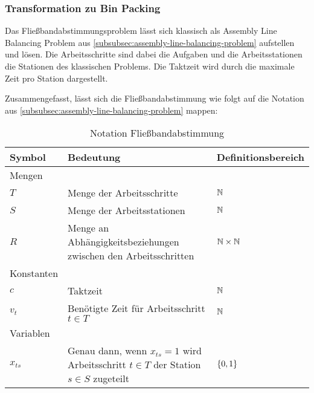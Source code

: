 \subsubsection*{Transformation zu Bin Packing}
Das Fließbandabstimmungsproblem lässt sich klassisch als Assembly Line Balancing Problem aus
\cref{subsubsec:assembly-line-balancing-problem} aufstellen und lösen.
Die Arbeitsschritte sind dabei die Aufgaben und die Arbeitsstationen die Stationen des klassischen Problems.
Die Taktzeit wird durch die maximale Zeit pro Station dargestellt.

Zusammengefasst, lässt sich die Fließbandabstimmung wie folgt auf die Notation aus
\cref{subsubsec:assembly-line-balancing-problem} mappen:
\begin{table}[H]
    \begin{tabularx}{\textwidth}{  l | X | l }
    Symbol & Bedeutung & Definitionsbereich \\\hline\hline
    Mengen & & \\\hline\hline
    $T$ & Menge der Arbeitsschritte & $\mathbb{N}$\\\hline
    $S$ & Menge der Arbeitsstationen & $\mathbb{N}$\\\hline
    $R$ & Menge an Abhängigkeitsbeziehungen zwischen den Arbeitsschritten & $\mathbb{N}\times\mathbb{N}$\\\hline\hline
    Konstanten &  &  \\\hline\hline
    $c$ & Taktzeit & $\mathbb{N}$\\\hline
    $v_t$ & Benötigte Zeit für Arbeitsschritt $t\in T$ & $\mathbb{N}$\\\hline\hline
    Variablen &  &  \\\hline\hline
    $x_{ts}$ & Genau dann, wenn $x_{ts}=1$ wird Arbeitsschritt $t\in T$ der Station $s\in S$ zugeteilt & $\{0,1\}$\\\hline
    \end{tabularx}
    \caption{Notation Fließbandabstimmung}\label{tab:notification_fliessbandabstimmung}
\end{table}
